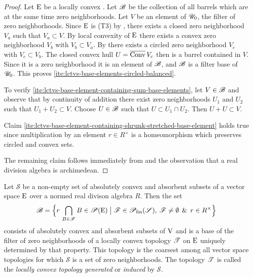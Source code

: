\begin{proof}
  Let $\mathrm{E}$ be a locally convex \tvs. Let $\mathscr{B}$ be the collection of all barrels 
  which are at the same time zero neighborhoods. Let $V$ be an element of $\mathscr{U}_0$,
  the filter of zero neighborhoods. Since $\mathrm{E}$ is \textsf{(T3)} by
  , there exists a closed
  zero neighborhood $V_a$ such that $V_a \subset V $.  By local convexity of $\mathrm{E}$ there exists
  a convex zero neighborhood $V_b$ with $V_b\subset V_a$. By
   there exists a circled
  zero neighborhood $V_c$ with $V_c\subset V_b$.  The closed convex hull $U = \overline{\operatorname{Conv}}\, V_c$ then is 
  a barrel contained in $V$. Since it is a zero neighborhood it is an element of $\mathscr{B}$, and $\mathscr{B}$
  is a filter base of $\mathscr{U}_0$.
  This proves \ref{ite:lctvs-base-elements-circled-balanced}.
  
  To verify \ref{ite:lctvs-base-element-containing-sum-base-elements}, let $V \in \mathscr{B}$ and observe that
  by continuity of addition there exist zero neighborhoods $U_1$ and $U_2$ such that $U_1 + U_2 \subset V$.
  Choose $U\in \mathscr{B} $ such that $U \subset U_1\cap U_2$. Then $U + U \subset V$.

  Claim \ref{ite:lctvs-base-element-containing-shrunk-stretched-base-element} holds true since multiplication
  by an element $r\in R^\times$ is a homeomorphism which preserves circled and convex sets.

  The remaining claim follows immediately from
  and the observation that a real division algebra is archimedean.
\end{proof}

\begin{corollary}
  Let  $\mathscr{S}$ be a non-empty set of absolutely convex and absorbent
  subsets of a vector space $\mathrm{E}$ over a normed real divison algebra $R$.
  Then the set
  \[
    \mathscr{B} = \Big\{ r\, \bigcap\limits_{B\in\mathscr{F}} B \in\mathscr{P}(\mathrm{E}) \bigm\vert
    \mathscr{F}\in \mathscr{P}_\textup{fin}(\mathscr{S}),\: \mathscr{F} \neq \emptyset \:\: \& \:\: r\in R^\times 
    \Big\}
  \]
  consists of absolutely convex and absorbent subsets of $\mathrm{V}$ and 
  is a base of the filter of zero neighborhoods of a locally convex topology
  $\mathscr{T}$ on $\mathrm{E}$ uniquely determined by that property.
  This topology is the coarsest among all vector space  topologies
  for which  $\mathscr{S}$ is a set of zero neighborhoods. The topology $\mathscr{T}$ is called the
  \emph{locally convex topology generated} or \emph{induced} by $\mathscr{S}$. 
\end{corollary}

